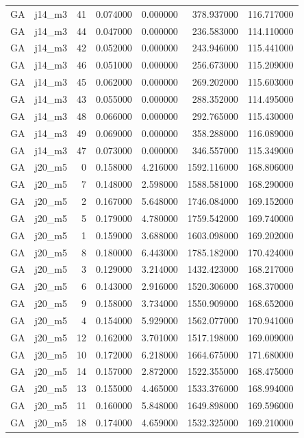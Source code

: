 \begin{tabular}{llrrrrr}
GA & j14_m3 & 41 & 0.074000 & 0.000000 & 378.937000 & 116.717000 \\
GA & j14_m3 & 44 & 0.047000 & 0.000000 & 236.583000 & 114.110000 \\
GA & j14_m3 & 42 & 0.052000 & 0.000000 & 243.946000 & 115.441000 \\
GA & j14_m3 & 46 & 0.051000 & 0.000000 & 256.673000 & 115.209000 \\
GA & j14_m3 & 45 & 0.062000 & 0.000000 & 269.202000 & 115.603000 \\
GA & j14_m3 & 43 & 0.055000 & 0.000000 & 288.352000 & 114.495000 \\
GA & j14_m3 & 48 & 0.066000 & 0.000000 & 292.765000 & 115.430000 \\
GA & j14_m3 & 49 & 0.069000 & 0.000000 & 358.288000 & 116.089000 \\
GA & j14_m3 & 47 & 0.073000 & 0.000000 & 346.557000 & 115.349000 \\
GA & j20_m5 & 0 & 0.158000 & 4.216000 & 1592.116000 & 168.806000 \\
GA & j20_m5 & 7 & 0.148000 & 2.598000 & 1588.581000 & 168.290000 \\
GA & j20_m5 & 2 & 0.167000 & 5.648000 & 1746.084000 & 169.152000 \\
GA & j20_m5 & 5 & 0.179000 & 4.780000 & 1759.542000 & 169.740000 \\
GA & j20_m5 & 1 & 0.159000 & 3.688000 & 1603.098000 & 169.202000 \\
GA & j20_m5 & 8 & 0.180000 & 6.443000 & 1785.182000 & 170.424000 \\
GA & j20_m5 & 3 & 0.129000 & 3.214000 & 1432.423000 & 168.217000 \\
GA & j20_m5 & 6 & 0.143000 & 2.916000 & 1520.306000 & 168.370000 \\
GA & j20_m5 & 9 & 0.158000 & 3.734000 & 1550.909000 & 168.652000 \\
GA & j20_m5 & 4 & 0.154000 & 5.929000 & 1562.077000 & 170.941000 \\
GA & j20_m5 & 12 & 0.162000 & 3.701000 & 1517.198000 & 169.009000 \\
GA & j20_m5 & 10 & 0.172000 & 6.218000 & 1664.675000 & 171.680000 \\
GA & j20_m5 & 14 & 0.157000 & 2.872000 & 1522.355000 & 168.475000 \\
GA & j20_m5 & 13 & 0.155000 & 4.465000 & 1533.376000 & 168.994000 \\
GA & j20_m5 & 11 & 0.160000 & 5.848000 & 1649.898000 & 169.596000 \\
GA & j20_m5 & 18 & 0.174000 & 4.659000 & 1532.325000 & 169.210000 \\

\end{tabular}
